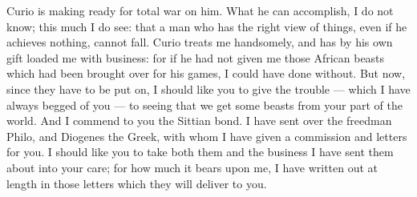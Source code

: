  Curio is making ready for total war on him. What he can accomplish, I do not know; this much I do see: that a man who has the right view of things, even if he achieves nothing, cannot fall. Curio treats me handsomely, and has by his own gift loaded me with business: for if he had not given me those African beasts which had been brought over for his games, I could have done without. But now, since they have to be put on, I should like you to give the trouble --- which I have always begged of you --- to seeing that we get some beasts from your part of the world. And I commend to you the Sittian bond. I have sent over the freedman Philo, and Diogenes the Greek, with whom I have given a commission and letters for you. I should like you to take both them and the business I have sent them about into your care; for how much it bears upon me, I have written out at length in those letters which they will deliver to you.
